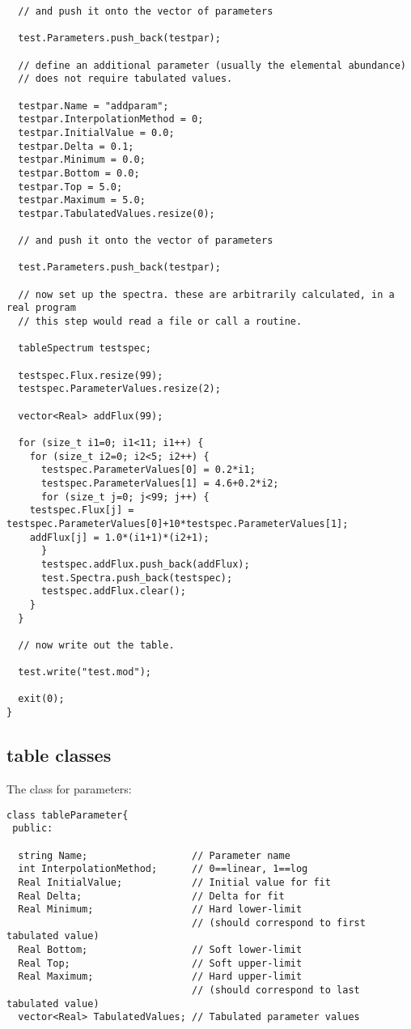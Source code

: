 \documentclass[11pt]{book}
\begin{document}
\begin{verbatim}
  // and push it onto the vector of parameters

  test.Parameters.push_back(testpar);

  // define an additional parameter (usually the elemental abundance)
  // does not require tabulated values.

  testpar.Name = "addparam";
  testpar.InterpolationMethod = 0;
  testpar.InitialValue = 0.0;
  testpar.Delta = 0.1;
  testpar.Minimum = 0.0;
  testpar.Bottom = 0.0;
  testpar.Top = 5.0;
  testpar.Maximum = 5.0;
  testpar.TabulatedValues.resize(0);

  // and push it onto the vector of parameters

  test.Parameters.push_back(testpar);

  // now set up the spectra. these are arbitrarily calculated, in a real program 
  // this step would read a file or call a routine.

  tableSpectrum testspec;

  testspec.Flux.resize(99);
  testspec.ParameterValues.resize(2);

  vector<Real> addFlux(99);

  for (size_t i1=0; i1<11; i1++) {
    for (size_t i2=0; i2<5; i2++) {
      testspec.ParameterValues[0] = 0.2*i1;
      testspec.ParameterValues[1] = 4.6+0.2*i2;
      for (size_t j=0; j<99; j++) {
	testspec.Flux[j] = testspec.ParameterValues[0]+10*testspec.ParameterValues[1];
	addFlux[j] = 1.0*(i1+1)*(i2+1);
      }
      testspec.addFlux.push_back(addFlux);
      test.Spectra.push_back(testspec);
      testspec.addFlux.clear();
    }
  }

  // now write out the table.

  test.write("test.mod");

  exit(0);
}
\end{verbatim}


\subsection{table classes}

The class for parameters:

\begin{verbatim}
class tableParameter{
 public:

  string Name;                  // Parameter name
  int InterpolationMethod;      // 0==linear, 1==log
  Real InitialValue;            // Initial value for fit
  Real Delta;                   // Delta for fit
  Real Minimum;                 // Hard lower-limit 
                                // (should correspond to first tabulated value)
  Real Bottom;                  // Soft lower-limit
  Real Top;                     // Soft upper-limit
  Real Maximum;                 // Hard upper-limit 
                                // (should correspond to last tabulated value)
  vector<Real> TabulatedValues; // Tabulated parameter values
\end{verbatim}
\end{document}
